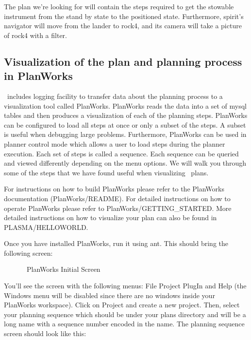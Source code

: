 \documentclass[10pt, letterpaper, twoside]{article}
\begin{document}
The plan we're looking for will contain the steps required to get the
stowable instrument from the stand by state to the positioned state.
Furthermore, spirit's navigator will move from the lander to rock4, and its
camera will take a picture of rock4 with a filter.



\subsection{Visualization of the plan and planning process in PlanWorks}
\label{visualization}
\ET\, includes logging facility to transfer data about the planning process
to a visualization tool called PlanWorks.  PlanWorks reads the data into a
set of mysql tables and then produces a visualization of each of the
planning steps. PlanWorks can be configured to load all steps at once or
only a subset of the steps.  A subset is useful when debugging large
problems. Furthermore, PlanWorks can be used in planner control mode which
allows a user to load steps during the planner execution.  Each set of
steps is called a sequence.  Each sequence can be queried and viewed
differently depending on the menu options.  We will walk you through some
of the steps that we have found useful when visualizing \ET\, plans.

For instructions on how to build PlanWorks please refer to the PlanWorks
documentation (PlanWorks/README).  For detailed instructions on how to
operate PlanWorks please refer to PlanWorks/GETTING\_STARTED.  More
detailed instructions on how to visualize your plan can also be found in
PLASMA/HELLOWORLD. 

Once you have installed PlanWorks, run it using ant.  This should bring the
following screen:

\begin{figure}[htb]
\centering{}
\caption{\ET\, PlanWorks Initial Screen}
\label{PlanWorksInitial}
\end{figure}

You'll see the screen with the following menus: File Project PlugIn
and Help (the Windows menu will be disabled since there are no windows
inside your PlanWorks workspace).  Click on Project and create a new
project. Then, select your planning sequence which should be under your
plans directory and will be a long name with a sequence number encoded in
the name.  The planning sequence screen should look like this:
\end{document}
